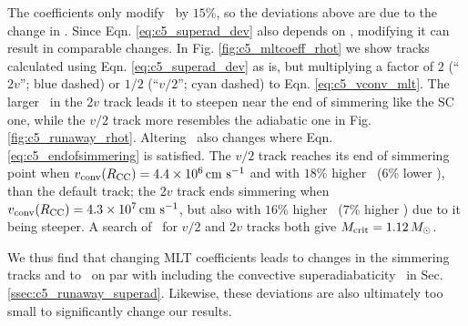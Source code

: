 
The \citeal{stev79} coefficients only modify \vconv\ by $15$\%, so the deviations above are due to the change in \deltanab.  Since Eqn. \ref{eq:c5_superad_dev} also depends on \vconv, modifying it can result in comparable changes.  In Fig. \ref{fig:c5_mltcoeff_rhot} we show tracks calculated using Eqn. \ref{eq:c5_superad_dev} as is, but multiplying a factor of $2$ (``$2v$''; blue dashed) or $1/2$ (``$v/2$''; cyan dashed) to Eqn. \ref{eq:c5_vconv_mlt}.  The larger \deltanab\ in the $2v$ track leads it to steepen near the end of simmering like the SC one, while the $v/2$ track more resembles the adiabatic one in Fig. \ref{fig:c5_runaway_rhot}.  Altering \vconv\ also changes where Eqn. \ref{eq:c5_endofsimmering} is satisfied.  The $v/2$ track reaches its end of simmering point when $\vconvrcc = 4.4\times10^6\,\cmpsec$ and with $18$\% higher \rhoc\ ($6$\% lower \Tc), than the default track; the $2v$ track ends simmering when $\vconvrcc = 4.3\times10^7\,\cmpsec$, but also with $16$\% higher \rhoc\ ($7$\% higher \Tc) due to it being steeper.  A search of \Mcrit\ for $v/2$ and $2v$ tracks both give $\Mcrit = 1.12\,\Msun$.



We thus find that changing MLT coefficients leads to changes in the simmering tracks and to \Mcrit\ on par with including the convective superadiabaticity \dnabconv\ in Sec. \ref{ssec:c5_runaway_superad}.  Likewise, these deviations are also ultimately too small to significantly change our results.



